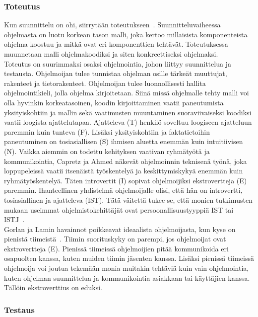 \documentclass[finnish]{../tktltiki2}
\theoremstyle{definition}
\theoremstyle{remark}
\begin{document}
\subsubsection{Toteutus}

Kun suunnittelu on ohi, siirrytään toteutukseen~\cite{SWEBOK:409902}. Suunnitteluvaiheessa ohjelmasta on luotu korkean tason malli, joka kertoo millaisista komponenteista ohjelma koostuu
ja mitkä ovat eri komponenttien tehtävät. Toteutuksessa muunnetaan malli ohjelmakoodiksi ja siten konkreettiseksi ohjelmaksi.\\

Toteutus on suurimmaksi osaksi ohjelmointia, johon liittyy suunnittelua ja testausta. Ohjelmoijan tulee tunnistaa ohjelman
osille tärkeät muuttujat, rakenteet ja tietorakenteet. Ohjelmoijan
tulee luonnollisesti hallita ohjelmointikieli, jolla ohjelma kirjoitetaan. Siinä missä ohjelmalle tehty malli voi olla hyvinkin korkeatasoinen, koodin kirjoittaminen vaatii paneutumista yksityiskohtiin ja mallin sekä vaatimusten muuntaminen suoraviivaiseksi koodiksi vaatii loogista ajattelutapaa. Ajatteleva (T)
henkilö soveltuu loogiseen ajatteluun paremmin kuin tunteva (F). Lisäksi yksityiskohtiin ja faktatietoihin paneutuminen on tosiasiallisen (S) ihmisen aluetta enemmän kuin intuitiivisen (N). Vaikka aiemmin on todettu kehityksen vaativan ryhmätyötä ja kommunikointia, Capretz ja Ahmed näkevät ohjelmoinnin teknisenä työnä, joka loppupeleissä vaatii itsenäistä työskentelyä ja keskittymiskykyä enemmän kuin ryhmätyöskentelyä. Täten introvertit (I) sopivat ohjelmoijiksi ekstrovertteja (E) paremmin. Ihanteellinen yhdistelmä ohjelmoijalle olisi, että hän on introvertti, tosiasiallinen ja ajatteleva (IST). Tätä väitettä tukee se, että monien tutkimusten mukaan useimmat ohjelmistokehittäjät ovat persoonallisuustyyppiä IST tai ISTJ~\cite{Capretz:2003:PTS:766407.766410,Capretz:2010:MSS:1726559.1726574}.\\

Gorlan ja Lamin havainnot poikkeavat ideaalista ohjelmoijasta, kun kyse on pienistä tiimeistä~\cite{Gorla:2004:WWB:990680.990684}. Tiimin suorituskyky on parempi, jos ohjelmoijat ovat ekstrovertteja (E). Pienissä tiimeissä ohjelmoijien pitää kommunikoida eri osapuolten kanssa, kuten muiden tiimin jäsenten kanssa. Lisäksi pienissä tiimeissä ohjelmoija voi joutua tekemään monia muitakin tehtäviä kuin vain ohjelmointia, kuten ohjelman suunnittelua ja kommunikointia asiakkaan tai käyttäjien kanssa. Tällöin ekstroverttius on eduksi.

\subsubsection{Testaus}
\end{document}
